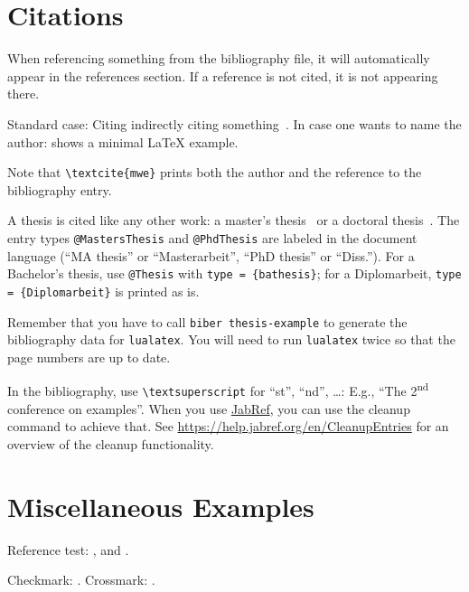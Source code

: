 \documentclass[../thesis-example-en]{subfiles}
\begin{document}
\section{Citations}

When referencing something from the bibliography file, it will automatically appear in the references section.
If a reference is not cited, it is not appearing there.

\begin{ltgexample}
Standard case: Citing indirectly citing something~\cite{mwe}.
In case one wants to name the author: \textcite{mwe} shows a minimal \LaTeX{} example.
\end{ltgexample}

Note that \texttt{\textbackslash textcite\{mwe\}} prints both the author and the reference to the bibliography entry.

A thesis is cited like any other work: a master's thesis~\cite{Shannon1940} or a doctoral thesis~\cite{Nash1950}.
The entry types \texttt{@MastersThesis} and \texttt{@PhdThesis} are labeled in the document language (\enquote{MA thesis} or \enquote{Masterarbeit}, \enquote{PhD thesis} or \enquote{Diss.}).
For a Bachelor's thesis, use \texttt{@Thesis} with \texttt{type = \{bathesis\}}; for a Diplomarbeit, \texttt{type = \{Diplomarbeit\}} is printed as is.

Remember that you have to call \texttt{biber thesis-example} to generate the bibliography data for \texttt{lualatex}.
You will need to run \texttt{lualatex} twice so that the page numbers are up to date.


In the bibliography, use \texttt{\textbackslash textsuperscript} for \enquote{st}, \enquote{nd}, \ldots:
E.g., \enquote{The 2\textsuperscript{nd} conference on examples}.
When you use \href{https://www.jabref.org}{JabRef}, you can use the cleanup command to achieve that.
See \url{https://help.jabref.org/en/CleanupEntries} for an overview of the cleanup functionality.

\section{Miscellaneous Examples}
\label{ssec:example}

Reference test: ,  and .

\begin{ltgexample}
Checkmark: \dingcheck.
Crossmark: \dingcross.
\end{ltgexample}
\end{document}
